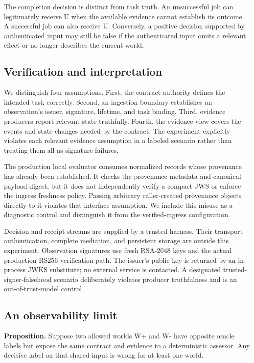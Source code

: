 \documentclass[11pt]{article}
\begin{document}
The completion decision is distinct from task truth. An unsuccessful job can legitimately receive U when the available evidence cannot establish its outcome. A successful job can also receive U. Conversely, a positive decision supported by authenticated input may still be false if the authenticated input omits a relevant effect or no longer describes the current world.

\subsection{Verification and interpretation}
We distinguish four assumptions. First, the contract authority defines the intended task correctly. Second, an ingestion boundary establishes an observation's issuer, signature, lifetime, and task binding. Third, evidence producers report relevant state truthfully. Fourth, the evidence view covers the events and state changes needed by the contract. The experiment explicitly violates each relevant evidence assumption in a labeled scenario rather than treating them all as signature failures.

The production local evaluator consumes normalized records whose provenance has already been established. It checks the provenance metadata and canonical payload digest, but it does not independently verify a compact JWS or enforce the ingress freshness policy. Passing arbitrary caller-created provenance objects directly to it violates that interface assumption. We include this misuse as a diagnostic control and distinguish it from the verified-ingress configuration.

Decision and receipt streams are supplied by a trusted harness. Their transport authentication, complete mediation, and persistent storage are outside this experiment. Observation signatures use fresh RSA-2048 keys and the actual production RS256 verification path. The issuer's public key is returned by an in-process JWKS substitute; no external service is contacted. A designated trusted-signer-falsehood scenario deliberately violates producer truthfulness and is an out-of-trust-model control.

\subsection{An observability limit}
\textbf{Proposition.} Suppose two allowed worlds W+ and W- have opposite oracle labels but expose the same contract and evidence to a deterministic assessor. Any decisive label on that shared input is wrong for at least one world.
\end{document}
